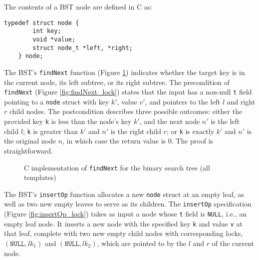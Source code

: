 \documentclass[sigplan,screen]{acmart}
\begin{document}
The contents of a BST node are defined in C as:
\begin{lstlisting}[style=myStyle, numbers=none, xleftmargin=0.5em]
	typedef struct node {
		int key; 
		void *value; 
		struct node_t *left, *right;
	} node;
\end{lstlisting}
The BST's \lstinline{findNext} function (Figure \ref{findnext}) indicates whether the target key is in the current node, its left subtree, or its right subtree. The precondition of \texttt{findNext} (Figure \ref*{fig:findNext_lock}) states that the input has a non-null \texttt{t} field pointing to a \texttt{node} struct with key $k'$, value $v'$, and pointers to the left $l$ and right $r$ child nodes. The postcondition describes three possible outcomes: either the provided key \texttt{k} is less than the node's key $k'$, and the next node $n'$ is the left child $l$; \lstinline{k} is greater than $k'$ and $n'$ is the right child $r$; or \lstinline{k} is exactly $k'$ and $n'$ is the original node $n$, in which case the return value is 0. The proof is straightforward.
\begin{figure}[ht]
	\begin{minipage}{0.45\textwidth}
	 
	\end{minipage}
	\caption{C implementation of \lstinline{findNext} for the binary search tree (all templates)}
	\label{findnext}
\end{figure}

The BST's \lstinline{insertOp} function allocates a new \lstinline{node} struct at an empty leaf, as well as two new empty leaves to serve as its children. The \texttt{insertOp} specification (Figure \ref{fig:insertOp_lock}) takes as input a node whose \lstinline{t} field is \lstinline{NULL}, i.e., an empty leaf node. It inserts a new node with the specified key \texttt{k} and value \texttt{v} at that leaf, complete with two new empty child nodes with corresponding locks, $(\texttt{NULL}, \mathit{lk}_1)$ and $(\texttt{NULL}, \mathit{lk}_2)$, which are pointed to by the $l$ and $r$ of the current node.
\end{document}
